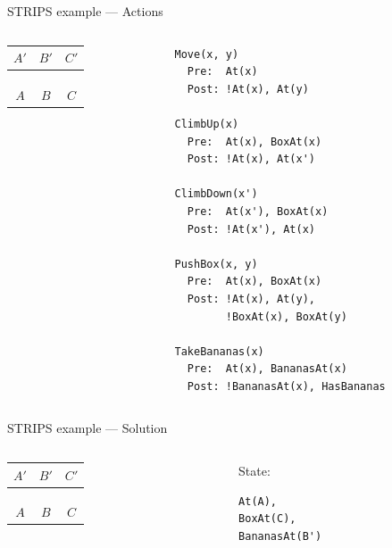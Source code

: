\begin{frame}[fragile]{STRIPS example --- Actions}
	\begin{columns}
		\begin{column}{0.4\textwidth}
			\begin{tabular}{c|c|c}
				  $A'$  &   $B'$  &   $C'$  \\\hline
				\emptyy & \banana & \emptyy \\
				\emptyy & \emptyy & \emptyy \\
				\monkey & \emptyy & \boxbox \\\hline
				  $A$   &   $B$   &    $C$
			\end{tabular}
		\end{column}
		\begin{column}{0.58\textwidth}
			\begin{lstlisting}
Move(x, y)
  Pre:  At(x)
  Post: !At(x), At(y)

ClimbUp(x)
  Pre:  At(x), BoxAt(x)
  Post: !At(x), At(x')

ClimbDown(x')
  Pre:  At(x'), BoxAt(x)
  Post: !At(x'), At(x)

PushBox(x, y)
  Pre:  At(x), BoxAt(x)
  Post: !At(x), At(y),
        !BoxAt(x), BoxAt(y)

TakeBananas(x)
  Pre:  At(x), BananasAt(x)
  Post: !BananasAt(x), HasBananas
			\end{lstlisting}
		\end{column}
	\end{columns}
\end{frame}

\begin{frame}[fragile]{STRIPS example --- Solution}
	\begin{columns}
		\begin{column}{0.4\textwidth}
	\begin{center}
			\begin{tabular}{c|c|c}
				  $A'$  &   $B'$  &   $C'$  \\\hline
				\emptyy & \banana & \emptyy \\
				\emptyy & \emptyy & \emptyy \\
				\monkey & \emptyy & \boxbox \\\hline
				  $A$   &   $B$   &    $C$
			\end{tabular}
	\end{center}
		\end{column}
		\begin{column}{0.58\textwidth}
			State:
			\begin{lstlisting}
At(A),
BoxAt(C),
BananasAt(B')
			\end{lstlisting}
		\end{column}
	\end{columns}
\end{frame}

